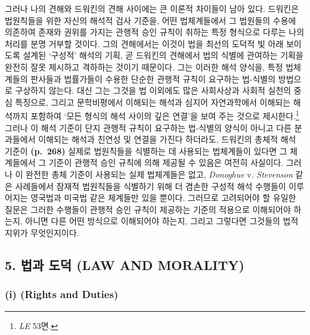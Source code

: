 그러나 나의 견해와 드워킨의 견해 사이에는 큰 이론적 차이들이 남아 있다.
드워킨은 법원칙들을 위한 자신의 해석적 검사 기준을, 어떤 법체계들에서 그
법원들의 수용에 의존하여 존재와 권위를 가지는 관행적 승인 규칙이 취하는
특정 형식으로 다루는 나의 처리를 분명 거부할 것이다. 그의 견해에서는
이것이 법을 최선의 도덕적 빛 아래 보이도록 설계된 ‘구성적’ 해석의 기획,
곧 드워킨의 견해에서 법의 식별에 관여하는 기획을 완전히 잘못 제시하고
격하하는 것이기 때문이다. 그는 이러한 해석 양식을, 특정 법체계들의
판사들과 법률가들이 수용한 단순한 관행적 규칙이 요구하는 법-식별의
방법으로 구상하지 않는다. 대신 그는 그것을 법 이외에도 많은 사회사상과
사회적 실천의 중심 특징으로, 그리고 문학비평에서 이해되는 해석과 심지어
자연과학에서 이해되는 해석까지 포함하여 ‘모든 형식의 해석 사이의 깊은
연결’을 보여 주는 것으로 제시한다.\footnote{\emph{LE} 53면.} 그러나 이
해석 기준이 단지 관행적 규칙이 요구하는 법-식별의 양식이 아니고 다른
분과들에서 이해되는 해석과 친연성 및 연결을 가진다 하더라도, 드워킨의
총체적 해석 기준이 \textbf{(p.~268)} 실제로 법원칙들을 식별하는 데
사용되는 법체계들이 있다면 그 체계들에서 그 기준이 관행적 승인 규칙에
의해 제공될 수 있음은 여전히 사실이다. 그러나 이 완전한 총체 기준이
사용되는 실제 법체계들은 없고, \emph{Donoghue} v. \emph{Stevenson} 같은
사례들에서 잠재적 법원칙들을 식별하기 위해 더 겸손한 구성적 해석
수행들이 이루어지는 영국법과 미국법 같은 체계들만 있을 뿐이다. 그러므로
고려되어야 할 유일한 질문은 그러한 수행들이 관행적 승인 규칙이 제공하는
기준의 적용으로 이해되어야 하는지, 아니면 다른 어떤 방식으로 이해되어야
하는지, 그리고 그렇다면 그것들의 법적 지위가 무엇인지이다.

\subsection{5. 법과 도덕 (LAW AND
MORALITY)}\label{uxbc95uxacfc-uxb3c4uxb355-law-and-morality}

\subsubsection{\texorpdfstring{(i)  (Rights and
Duties)}{(i) 권리들과 책무들 (Rights and Duties)}}\label{i-uxad8cuxb9acuxb4e4uxacfc-uxcc45uxbb34uxb4e4-rights-and-duties}

